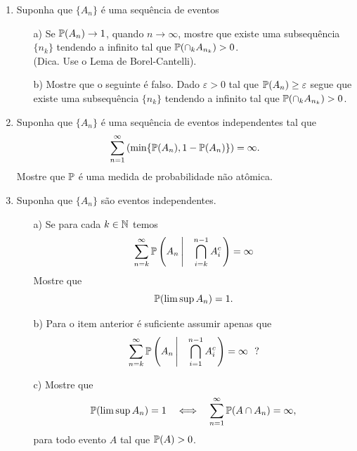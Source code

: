 \begin{enumerate}[leftmargin=*]
\item Suponha que $\{A_n\}$ é uma sequência de eventos
	\begin{itemize}
		\item[a)]
		Se $\P(A_n)\to 1$, quando $n\to\infty$, mostre que 
		existe uma subsequência $\{n_k\}$ tendendo a infinito
		tal que $\P(\cap_{k} A_{n_k})>0$.
		\\
		(Dica. Use o Lema de Borel-Cantelli).
		
		
		\item[b)]
		Mostre que o seguinte é falso. Dado $\varepsilon>0$
		tal que $\P(A_n)\geq \varepsilon$ segue que existe uma subsequência
		$\{n_k\}$ tendendo a infinito tal que $\P(\cap_k A_{n_k})>0$.		
		
		
	\end{itemize}








\item 
Suponha que $\{A_n\}$ é uma sequência de eventos 
independentes tal que 
	\[
		\sum_{n=1}^{\infty}
		\left( 
			\min\{ \P(A_n), 1-\P(A_n) \}
		\right)	
		=\infty.
	\]
Mostre que $\P$ é uma medida de probabilidade 
não atômica.





\item Suponha que $\{A_n\}$ são eventos independentes.
	\begin{itemize}
		\item[a)]
		Se para cada $k\in\N$ temos 
			\[
				\sum_{n=k}^{\infty} 
				\P \left( A_n \left| \quad \bigcap_{i=k}^{n-1} A_i^c\right. \right)
				=\infty
			\]		
		Mostre que 
			\[
				\P(\limsup A_n) =1.
			\]
		
		\item[b)] Para o item anterior é suficiente assumir apenas que 
			\[
				\sum_{n=k}^{\infty} 
				\P \left( A_n \left| \quad  \bigcap_{i=1}^{n-1} A_i^c\right. \right)
				=\infty \ \ ?
			\]		
			
		\item[c)] 
		Mostre que 
			\[
				\P(\limsup A_n) =1
				\quad
				\Longleftrightarrow
				\quad
				\sum_{n=1}^{\infty} \P(A\cap A_n)
				=\infty,
			\]
		para todo evento $A$ tal que $\P(A)>0$.	
		
	\end{itemize}










\end{enumerate}

